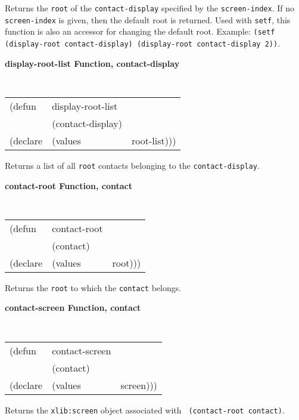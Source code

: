\begin{flushright} \parbox[t]{6.125in}{
Returns the  {\tt root} of the {\tt contact-display} specified by the
{\tt screen-index}.  If no {\tt screen-index} is given, then the default
root is returned. Used
with {\tt setf}, this function is also an accessor for
changing the default root. Example: {\tt (setf (display-root  
contact-display) (display-root contact-display 2))}.

}\end{flushright}

{\samepage
{\large {\bf display-root-list \hfill Function, contact-display}}
\begin{flushright} \parbox[t]{6.125in}{
\tt
\begin{tabular}{lll}
\raggedright
(defun & display-root-list & \\ 
& (contact-display) \\
(declare &(values  & root-list)))
\end{tabular}
\rm

}\end{flushright}
}

\begin{flushright} \parbox[t]{6.125in}{
Returns a list of all {\tt root} contacts belonging to the {\tt contact-display}.
}\end{flushright}


{\samepage
{\large {\bf contact-root \hfill Function, contact}}
\begin{flushright} \parbox[t]{6.125in}{
\tt
\begin{tabular}{lll}
\raggedright
(defun & contact-root & \\ 
& (contact) \\
(declare &(values  & root)))
\end{tabular}
\rm

Returns the {\tt root} to which the {\tt contact} belongs. 
}\end{flushright}}

{\samepage
{\large {\bf contact-screen \hfill Function, contact}}
\begin{flushright} \parbox[t]{6.125in}{
\tt
\begin{tabular}{lll}
\raggedright
(defun & contact-screen & \\ 
& (contact) \\
(declare &(values  & screen)))
\end{tabular}
\rm

Returns the {\tt xlib:screen} object associated with {\tt
(contact-root contact)}. 
}\end{flushright}}



